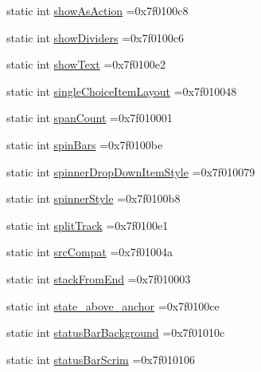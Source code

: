 \begin{DoxyCompactItemize}
\item 
static int \hyperlink{classandroid_1_1support_1_1v7_1_1mediarouter_1_1R_1_1attr_acab72cb74472022e2dbb10ab9c0eb017}{show\+As\+Action} =0x7f0100c8
\item 
static int \hyperlink{classandroid_1_1support_1_1v7_1_1mediarouter_1_1R_1_1attr_a15ec98a1d65d2408a839345928a6c59d}{show\+Dividers} =0x7f0100c6
\item 
static int \hyperlink{classandroid_1_1support_1_1v7_1_1mediarouter_1_1R_1_1attr_a26211d9eb735cfec1338b7c826645ce7}{show\+Text} =0x7f0100e2
\item 
static int \hyperlink{classandroid_1_1support_1_1v7_1_1mediarouter_1_1R_1_1attr_aec1486090b6c1e8a66f14d79efdb2b40}{single\+Choice\+Item\+Layout} =0x7f010048
\item 
static int \hyperlink{classandroid_1_1support_1_1v7_1_1mediarouter_1_1R_1_1attr_aaacd26dca5bbd7b54e2c2036015d289f}{span\+Count} =0x7f010001
\item 
static int \hyperlink{classandroid_1_1support_1_1v7_1_1mediarouter_1_1R_1_1attr_aa260067bb070619d75ad966a1c005ae3}{spin\+Bars} =0x7f0100be
\item 
static int \hyperlink{classandroid_1_1support_1_1v7_1_1mediarouter_1_1R_1_1attr_a9d74d670aa6baf3da1cbd7cf6b112023}{spinner\+Drop\+Down\+Item\+Style} =0x7f010079
\item 
static int \hyperlink{classandroid_1_1support_1_1v7_1_1mediarouter_1_1R_1_1attr_a6bbcb4b4bdf41ad15231f9ec5bb86d9c}{spinner\+Style} =0x7f0100b8
\item 
static int \hyperlink{classandroid_1_1support_1_1v7_1_1mediarouter_1_1R_1_1attr_aa03b4010fc09e6f0eefb355dd934ba9c}{split\+Track} =0x7f0100e1
\item 
static int \hyperlink{classandroid_1_1support_1_1v7_1_1mediarouter_1_1R_1_1attr_ab68acd44f9c211553442b740a973421c}{src\+Compat} =0x7f01004a
\item 
static int \hyperlink{classandroid_1_1support_1_1v7_1_1mediarouter_1_1R_1_1attr_a26c262877113677509b313d3cc45bc3f}{stack\+From\+End} =0x7f010003
\item 
static int \hyperlink{classandroid_1_1support_1_1v7_1_1mediarouter_1_1R_1_1attr_af5c16e95162c3cece10441e854e43361}{state\+\_\+above\+\_\+anchor} =0x7f0100ce
\item 
static int \hyperlink{classandroid_1_1support_1_1v7_1_1mediarouter_1_1R_1_1attr_a1cf3a847f3fe4c1f3844025cd72bee50}{status\+Bar\+Background} =0x7f01010c
\item 
static int \hyperlink{classandroid_1_1support_1_1v7_1_1mediarouter_1_1R_1_1attr_aedf7a192f38a7835b73424353ad41371}{status\+Bar\+Scrim} =0x7f010106

\end{DoxyCompactItemize}
